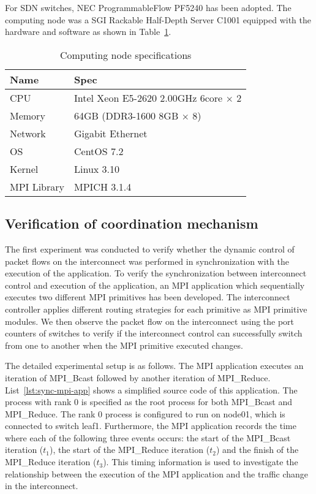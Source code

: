 For SDN switches, NEC ProgrammableFlow PF5240 has been adopted. The computing
node was a SGI Rackable Half-Depth Server C1001 equipped with the hardware and
software as shown in Table~\ref{tbl:node-spec}.

\begin{table}
    \centering
    \caption{Computing node specifications}%
    \label{tbl:node-spec}
    \begin{tabular}{ll}
        \toprule
        Name        & Spec                                        \\ \midrule
        CPU         & Intel Xeon E5-2620 2.00GHz 6core $\times$ 2 \\
        Memory      & 64GB (DDR3-1600 8GB $\times$ 8)             \\
        Network     & Gigabit Ethernet                            \\
        OS          & CentOS 7.2                                  \\
        Kernel      & Linux 3.10                                  \\
        MPI Library & MPICH 3.1.4                                 \\ \bottomrule
    \end{tabular}
\end{table}

\subsection{Verification of coordination mechanism}

The first experiment was conducted to verify whether the dynamic control
of packet flows on the interconnect was performed in synchronization
with the execution of the application. To verify the synchronization
between interconnect control and execution of the application, an MPI
application which sequentially executes two different MPI primitives has
been developed. The interconnect controller applies different routing
strategies for each primitive as MPI primitive modules. We then observe
the packet flow on the interconnect using the port counters of switches
to verify if the interconnect control can successfully switch from one
to another when the MPI primitive executed changes.

The detailed experimental setup is as follows. The MPI application
executes an iteration of MPI\_Bcast followed by another iteration of
MPI\_Reduce. List~\ref{lst:sync-mpi-app} shows a simplified source code
of this application. The process with rank 0 is specified as the root
process for both MPI\_Bcast and MPI\_Reduce. The rank 0 process is
configured to run on node01, which is connected to switch leaf1.
Furthermore, the MPI application records the time where each of the
following three events occurs: the start of the MPI\_Bcast iteration
(\(t_1\)), the start of the MPI\_Reduce iteration (\(t_2\)) and the
finish of the MPI\_Reduce iteration (\(t_3\)). This timing information
is used to investigate the relationship between the execution of the MPI
application and the traffic change in the interconnect.

